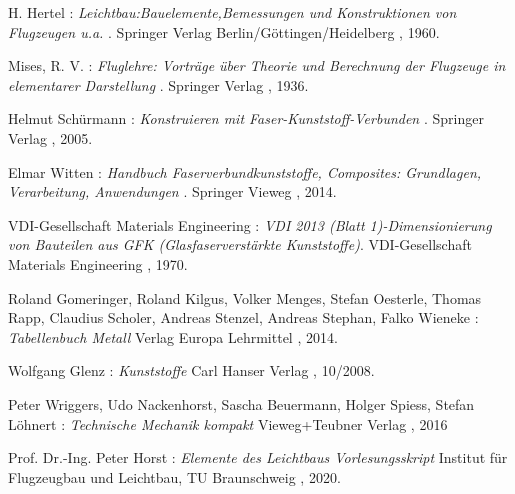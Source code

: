 \begin{thebibliography}{99}          
	H. Hertel :
	\textit { Leichtbau:Bauelemente,Bemessungen und Konstruktionen von Flugzeugen u.a. }.
	Springer Verlag Berlin/Göttingen/Heidelberg , 1960.
	
	Mises, R. V. :
	\textit { Fluglehre: Vorträge über Theorie und Berechnung der Flugzeuge in elementarer Darstellung }.
	Springer Verlag , 1936.
	
	Helmut Schürmann :
	\textit { Konstruieren mit Faser-Kunststoff-Verbunden }.
	Springer Verlag , 2005.
	
	Elmar Witten :
	\textit { Handbuch Faserverbundkunststoffe, Composites: Grundlagen, Verarbeitung, Anwendungen }.
	Springer Vieweg , 2014.
	
	VDI-Gesellschaft Materials Engineering :
	\textit{ VDI 2013 (Blatt 1)-Dimensionierung von Bauteilen aus GFK (Glasfaserverstärkte Kunststoffe)}.
	VDI-Gesellschaft Materials Engineering , 1970.
	
	Roland Gomeringer, Roland Kilgus, Volker Menges, Stefan Oesterle, Thomas Rapp, Claudius Scholer, Andreas Stenzel, Andreas Stephan, Falko Wieneke :
	\textit{ Tabellenbuch Metall}
	Verlag Europa Lehrmittel , 2014.
	
	Wolfgang Glenz :
	\textit{ Kunststoffe }
	Carl Hanser Verlag , 10/2008.
	
	
	Peter Wriggers, Udo Nackenhorst, Sascha Beuermann, Holger Spiess, Stefan Löhnert :
	\textit{Technische Mechanik kompakt}
	Vieweg+Teubner Verlag , 2016
	
	
	Prof. Dr.-Ing. Peter Horst :
	\textit{Elemente des Leichtbaus Vorlesungsskript}
	Institut für Flugzeugbau und Leichtbau, TU Braunschweig , 2020.





	
	
\end{thebibliography}